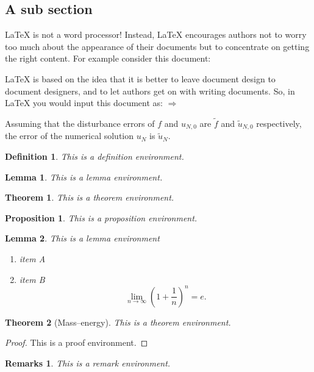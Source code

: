 \documentclass[openany,twoside,12pt]{book}
\theoremstyle{plain}
\newtheorem{definition}{Definition}[chapter]
\newtheorem{proposition}{Proposition}[chapter]
\newtheorem{lemma}{Lemma}[chapter]
\newtheorem{theorem}{Theorem}[chapter]
\newtheorem{remark}{Remarks}[chapter]
\numberwithin{equation}{chapter}
\numberwithin{figure}{chapter}
\numberwithin{table}{chapter}
\begin{document}
\subsection{A sub section}
LaTeX is not a word processor! Instead, LaTeX encourages authors not to worry too much about the appearance of their documents but to concentrate on getting the right content. For example consider this document:

LaTeX is based on the idea that it is better to leave document design to document designers, and to let authors get on with writing documents. So, in LaTeX you would input this document as:
$ \Rightarrow $

Assuming that the disturbance errors of $f$ and $u_{N,0}$ are $\tilde{f}$ and $\tilde{u}_{N,0}$ respectively, the error of the numerical solution $u_N$ is $\tilde{u}_N$.


\begin{definition}
This is a definition environment.
\end{definition}

\begin{lemma}
This is a lemma environment.
\end{lemma}

\begin{theorem}
This is a theorem environment.
\end{theorem}

\begin{proposition}
This is a proposition environment.
\end{proposition}

\begin{lemma}
This is a lemma environment
\begin{enumerate}[label=\rm (\roman*)]
  \item item A
  \item item B
  \begin{equation}\label{eq:limite}
    \lim_{n\to\infty}\left(1+\frac{1}{n}\right)^n=e.
  \end{equation}
\end{enumerate}
\end{lemma}

\begin{theorem}[Mass--energy]
This is a theorem environment.
\end{theorem}
\begin{proof}
  This is a proof environment.
\end{proof}

\begin{remark}
  This is a remark environment.
\end{remark}
\end{document}
